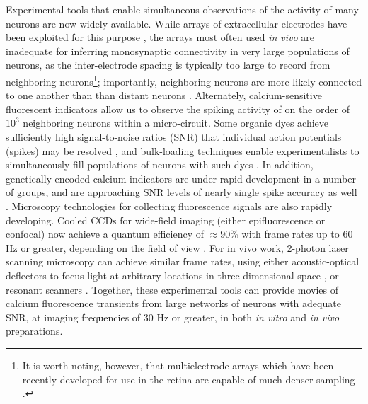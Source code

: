 \documentclass[aoas,preprint]{imsart}
\begin{document}
Experimental tools that enable simultaneous observations of the
activity of many neurons are now widely available. While arrays of
extracellular electrodes have been exploited for this purpose
\cite{HATS98,HARR03,Stein04,Santhanam06,Harris07}, the arrays most
often used \emph{in vivo} are inadequate for inferring monosynaptic
connectivity in very large populations of neurons, as the
inter-electrode spacing is typically too large to record from
neighboring neurons\footnote{It is worth noting, however, that
multielectrode arrays which have been recently developed for use in
the retina are capable of much denser sampling
\cite{Berry2004,Litke2004,Petrusca07,PILL07}.}; importantly,
neighboring neurons are more likely connected to one another than than
distant neurons \cite{Abeles91,Braitenberg1998}.  Alternately,
calcium-sensitive fluorescent indicators allow us to observe the
spiking activity of on the order of $10^3$ neighboring neurons
\cite{Tsien89,ImagingManual,CAR03,OHKI05} within a micro-circuit.
Some organic dyes achieve sufficiently high signal-to-noise ratios
(SNR) that individual action potentials (spikes) may be resolved
\cite{ImagingManual}, and bulk-loading techniques enable
experimentalists to simultaneously fill populations of neurons with
such dyes \cite{StosiekKonnerth03}. In addition, genetically encoded
calcium indicators are under rapid development in a number of groups,
and are approaching SNR levels of nearly single spike accuracy as well
\cite{WallaceHasan08}. Microscopy technologies for collecting
fluorescence signals are also rapidly developing. Cooled CCDs for
wide-field imaging (either epifluorescence or confocal) now achieve a
quantum efficiency of $\approx 90 \%$ with frame rates up to $60$ Hz
or greater, depending on the field of view \cite{Djurisic04}. For in
vivo work, 2-photon laser scanning microscopy can achieve similar
frame rates, using either acoustic-optical deflectors to focus light
at arbitrary locations in three-dimensional space
\cite{Iyer06,SalomeBourdieu06,ReddySaggau08}, or resonant scanners
\cite{NguyenParker01}. Together, these experimental tools can provide
movies of calcium fluorescence transients from large networks of
neurons with adequate SNR, at imaging frequencies of $30$ Hz or
greater, in both \emph{in vitro} and \emph{in vivo} preparations.
\end{document}
